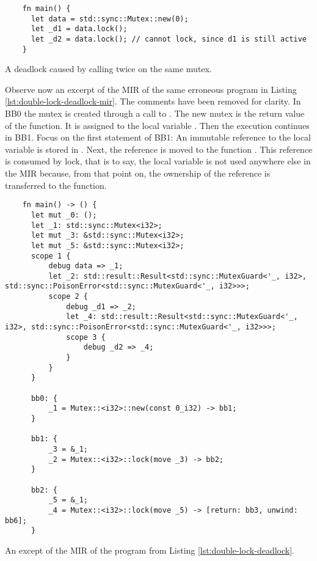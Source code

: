 \begin{listing}[!htb]
  \begin{verbatim}
    fn main() {
      let data = std::sync::Mutex::new(0);
      let _d1 = data.lock();
      let _d2 = data.lock(); // cannot lock, since d1 is still active
    }
  \end{verbatim}
  \caption{A deadlock caused by calling  twice on the same mutex.}
  \label{lst:double-lock-deadlock}
\end{listing}

Observe now an excerpt of the \acrshort{MIR}
of the same erroneous program in Listing \ref{lst:double-lock-deadlock-mir}.
The comments have been removed for clarity.
In BB0 the mutex is created through a call to .
The new mutex is the return value of the function.
It is assigned to the local variable .
Then the execution continues in BB1.
Focus on the first statement of BB1:
An immutable reference to the local variable  is stored in .
Next, the reference is moved to the function .
This reference is consumed by lock, that is to say,
the local variable  is not used anywhere else in the \acrshort{MIR}
because, from that point on, the ownership of the reference is transferred
to the  function.

\begin{listing}[!htb]
  \begin{verbatim}
    fn main() -> () {
      let mut _0: ();
      let _1: std::sync::Mutex<i32>;
      let mut _3: &std::sync::Mutex<i32>;
      let mut _5: &std::sync::Mutex<i32>;
      scope 1 {
          debug data => _1;
          let _2: std::result::Result<std::sync::MutexGuard<'_, i32>, std::sync::PoisonError<std::sync::MutexGuard<'_, i32>>>;
          scope 2 {
              debug _d1 => _2;
              let _4: std::result::Result<std::sync::MutexGuard<'_, i32>, std::sync::PoisonError<std::sync::MutexGuard<'_, i32>>>; 
              scope 3 {
                  debug _d2 => _4;
              }
          }
      }
  
      bb0: {
          _1 = Mutex::<i32>::new(const 0_i32) -> bb1;
      }
  
      bb1: {
          _3 = &_1;
          _2 = Mutex::<i32>::lock(move _3) -> bb2;
      }
  
      bb2: {
          _5 = &_1;
          _4 = Mutex::<i32>::lock(move _5) -> [return: bb3, unwind: bb6];
      }
  \end{verbatim}
  \caption{An except of the MIR of the program from Listing \ref{lst:double-lock-deadlock}.}
  \label{lst:double-lock-deadlock-mir}
\end{listing}

